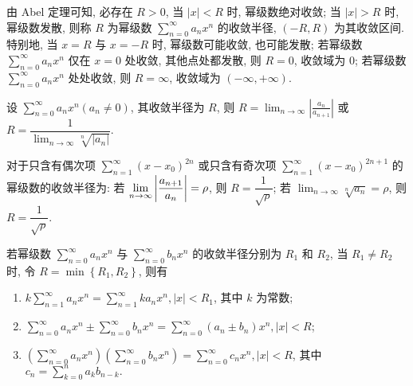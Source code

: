 \begin{definition}[收敛半径与收敛区间]
    由 Abel 定理可知, 必存在 $ R>0 $, 当 $ |x|<R $ 时, 幂级数绝对收敛; 当 $ |x|>R $ 时, 幂级数发散, 则称 $ R $ 为幂级数 $\displaystyle \sum_{n=0}^{\infty} a_{n} x^{n} $ 的收敛半径, $(-R, R) $ 为其收敛区间.\\
    特别地, 当 $ x=R $ 与 $ x=-R $ 时, 幂级数可能收敛, 也可能发散;
    若幂级数 $\displaystyle \sum_{n=0}^{\infty} a_{n} x^{n} $ 仅在 $ x=0 $ 处收敛, 其他点处都发散, 则 $ R=0 $, 收敛域为 $ \qty{0}$;
    若幂级数 $\displaystyle \sum_{n=0}^{\infty} a_{n} x^{n} $ 处处收敛, 则 $ R=\infty $, 收敛域为 $ (-\infty,+\infty) $.
\end{definition}

\begin{theorem}
    设 $\displaystyle \sum_{n=0}^{\infty} a_{n} x^{n}\left(a_{n} \neq 0\right) $, 其收敛半径为 $ R $,
    则 $\displaystyle  R=\lim _{n \to \infty}\left|\frac{a_{n}}{a_{n+1}}\right| $ 或 $\displaystyle R=\dfrac{1}{\displaystyle\lim _{n \to \infty} \sqrt[n]{\left|a_{n}\right|}} .$
\end{theorem}

\begin{theorem}[奇偶次项幂级数的收敛半径]
    对于只含有偶次项 $\displaystyle\sum_{n=1}^{\infty}(x-x_0)^{2n}$ 或只含有奇次项 $\displaystyle\sum_{n=1}^{\infty}(x-x_0)^{2n+1}$ 的幂级数的收敛半径为:
    若 $\displaystyle\lim_{n\to\infty}\qty|\dfrac{a_{n+1}}{a_n}|=\rho$, 则 $R=\dfrac{1}{\sqrt{\rho}}$; 若 $\displaystyle\lim_{n\to\infty}\sqrt[n]{a_n}=\rho$, 则 $R=\dfrac{1}{\sqrt{\rho}}.$
\end{theorem}

\begin{theorem}[幂级数的运算性质]
    若幂级数 $\displaystyle \sum_{n=0}^{\infty} a_{n} x^{n} $ 与 $\displaystyle \sum_{n=0}^{\infty} b_{n} x^{n} $ 的收敛半径分别为 $ R_{1} $ 和 $ R_{2} $,
    当 $ R_{1} \neq R_{2} $ 时, 令 $ R   =\min \left\{R_{1},R_{2}\right\} $, 则有
    \begin{enumerate}[label=(\arabic{*})]
        \item $\displaystyle k \sum_{n=1}^{\infty} a_{n} x^{n}=\sum_{n=1}^{\infty} k a_{n} x^{n},|x|<R_{1} $, 其中 $ k $ 为常数;
        \item $\displaystyle \sum_{n=0}^{\infty} a_{n} x^{n} \pm \sum_{n=0}^{\infty} b_{n} x^{n}=\sum_{n=0}^{\infty}\left(a_{n} \pm b_{n}\right) x^{n},|x|<R $;
        \item $\displaystyle \left(\sum_{n=0}^{\infty} a_{n} x^{n}\right)\left(\sum_{n=0}^{\infty} b_{n} x^{n}\right)=\sum_{n=0}^{\infty} c_{n} x^{n},|x|<R $, 其中 $\displaystyle c_{n}=\sum_{k=0}^{n} a_{k} b_{n-k} .$
    \end{enumerate}
\end{theorem}

